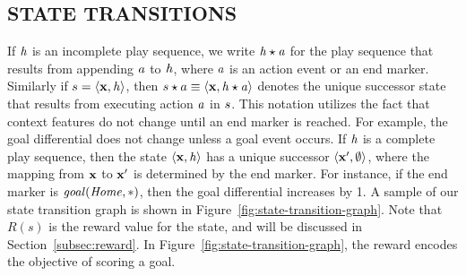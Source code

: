 \documentclass[]{article}
\begin{document}


\subsection{STATE TRANSITIONS}
\label{subsec:transitions}

If $\it{h}$ is an incomplete play sequence, we write $\it{h} \star a$ for the play sequence that results from appending $a$ to $\it{h}$, where $a$ is an action event or an end marker.
Similarly if $s = \langle \mathbf{x}, \it{h} \rangle$, then $s \star a \equiv \langle \mathbf{x}, \it{h} \star a \rangle$ denotes the unique successor state that results from executing action $a$ in  $s$.
This notation utilizes the fact that context features do not change until an end marker is reached.
For example, the goal differential does not change unless a goal event occurs.
If $\it{h}$ is a complete play sequence, then the state $\langle \mathbf{x}, \it{h} \rangle$ has a unique successor $\langle \mathbf{x}', \emptyset \rangle$, where the mapping from $\mathbf{x}$ to $\mathbf{x}'$ is determined by the end marker.
For instance, if the end marker is $\it{goal}(Home,*)$, then the goal differential increases by 1.
A sample of our state transition graph is shown in Figure~\ref{fig:state-transition-graph}.
Note that $R(s)$ is the reward value for the state, and will be discussed in Section~\ref{subsec:reward}.
In Figure~\ref{fig:state-transition-graph}, the reward encodes the objective of scoring a goal.
\end{document}
